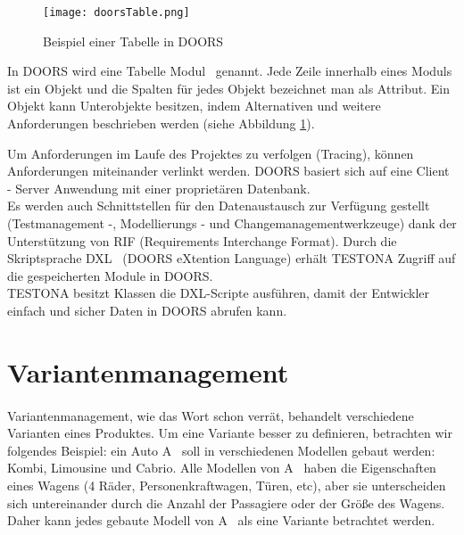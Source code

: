 \begin{figure}[h]
  \begin{center}
    \texttt{[image: doorsTable.png]}
  		  \caption{Beispiel einer Tabelle in DOORS}
     \label{doors.bespiel}
  \end{center}
\end{figure}


In DOORS wird eine Tabelle \glqq Modul\grqq~ genannt. Jede Zeile innerhalb eines Moduls  ist ein Objekt und die Spalten für jedes Objekt bezeichnet man als Attribut. Ein Objekt kann Unterobjekte besitzen, indem Alternativen und weitere Anforderungen beschrieben werden (siehe Abbildung \ref{doors.bespiel}).


Um Anforderungen im Laufe des Projektes zu verfolgen (Tracing), können Anforderungen miteinander verlinkt werden. DOORS basiert sich auf eine Client - Server Anwendung mit einer proprietären Datenbank. \\


Es werden auch Schnittstellen für den Datenaustausch zur Verfügung gestellt (Testmanagement -, Modellierungs - und Changemanagementwerkzeuge) dank der Unterstützung von RIF (Requirements Interchange Format). Durch die Skriptsprache \glqq DXL\grqq~ (DOORS eXtention Language) erhält TESTONA Zugriff auf die gespeicherten Module in DOORS. \cite{Doors} \cite{Anforderungsmanagement}\\

TESTONA besitzt Klassen die DXL-Scripte ausführen, damit der Entwickler einfach und sicher Daten in DOORS abrufen kann.


\newpage
\section{Variantenmanagement}\label{sec:VarManag}
\paragraph{}

Variantenmanagement, wie das Wort schon verrät, behandelt verschiedene Varianten eines Produktes. Um eine Variante besser zu definieren, betrachten wir folgendes Beispiel: ein Auto \glqq A\grqq~ soll in verschiedenen Modellen gebaut werden: Kombi, Limousine und Cabrio. Alle Modellen von \glqq A\grqq~ haben die Eigenschaften eines Wagens (4 Räder, Personenkraftwagen, Türen, etc), aber sie unterscheiden sich untereinander durch die Anzahl der Passagiere oder der Größe des Wagens. Daher kann jedes gebaute Modell von \glqq A\grqq~ als eine Variante betrachtet werden.\\


